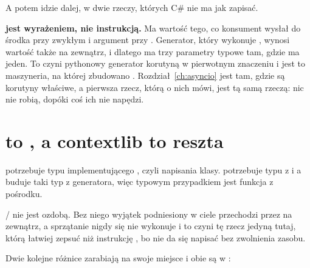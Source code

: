 \noindent
A potem idzie dalej, w dwie rzeczy, których C\# nie ma jak zapisać.




\begin{trapbox}
\textbf{ jest wyrażeniem, nie instrukcją.} Ma wartość tego, co
konsument wysłał do środka \dash{}  przy zwykłym  i
argument przy . Generator, który wykonuje , wynosi
wartość także na zewnątrz, i dlatego  ma trzy parametry
typowe tam, gdzie  ma jeden. To czyni pythonowy generator
korutyną w pierwotnym znaczeniu i jest to maszyneria, na której zbudowano
. Rozdział~\ref{ch:asyncio} jest tam, gdzie są korutyny
właściwe, a pierwsza rzecz, którą o nich mówi, jest tą samą rzeczą: nic nie
robią, dopóki coś ich nie napędzi.
\end{trapbox}

\section{ to , a contextlib to reszta}
\label{sec:ch05-with}

 potrzebuje typu implementującego
, czyli napisania klasy.  potrzebuje typu z
 i  \dash{} a
 buduje taki typ z generatora, więc
typowym przypadkiem jest funkcja z  pośrodku.


\begin{warning}
/ nie jest ozdobą. Bez niego wyjątek podniesiony w
ciele przechodzi przez  na zewnątrz, a sprzątanie nigdy się nie
wykonuje \dash{} i to czyni tę rzecz jedyną tutaj, którą łatwiej zepsuć niż
instrukcję , bo  nie da się napisać bez zwolnienia
zasobu.
\end{warning}

\noindent
Dwie kolejne różnice zarabiają na swoje miejsce i obie są w
:

